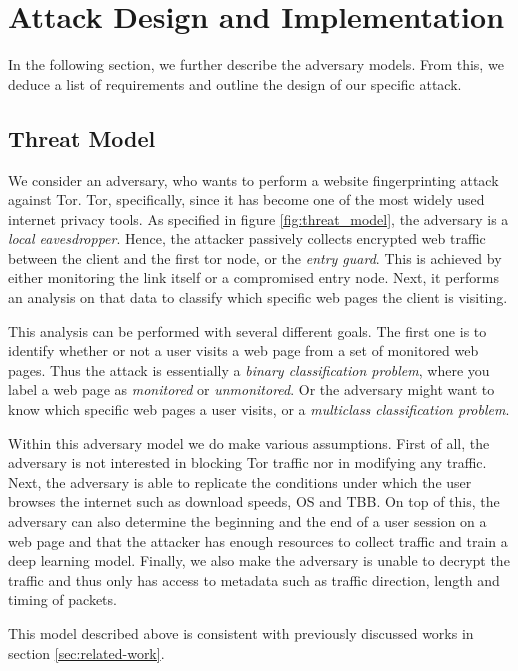 \section{Attack Design and Implementation}

In the following section, we further describe the adversary models.
From this, we deduce a list of requirements and outline the design of our specific attack.

\subsection{Threat Model}

We consider an adversary, who wants to perform a website fingerprinting attack against Tor.
Tor, specifically, since it has become one of the most widely used internet privacy tools.
As specified in figure \ref{fig:threat_model}, the adversary is a \textit{local eavesdropper}.
Hence, the attacker passively collects encrypted web traffic between the client and the first tor node, or the \textit{entry guard}.
This is achieved by either monitoring the link itself or a compromised entry node.
Next, it performs an analysis on that data to classify which specific web pages the client is visiting.

This analysis can be performed with several different goals.
The first one is to identify whether or not a user visits a web page from a set of monitored web pages.
Thus the attack is essentially a \textit{binary classification problem}, where you label a web page as \textit{monitored} or \textit{unmonitored}.
Or the adversary might want to know which specific web pages a user visits, or a \textit{multiclass classification problem}.

Within this adversary model we do make various assumptions.
First of all, the adversary is not interested in blocking Tor traffic nor in modifying any traffic.
Next, the adversary is able to replicate the conditions under which the user browses the internet such as download speeds, OS and TBB.
On top of this, the adversary can also determine the beginning and the end of a user session on a web page and that the attacker has enough resources to collect traffic and train a deep learning model.
Finally, we also make the adversary is unable to decrypt the traffic and thus only has access to metadata such as traffic direction, length and timing of packets.

This model described above is consistent with previously discussed works in section \ref{sec:related-work}.

